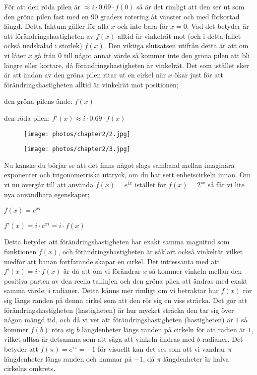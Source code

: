 \documentclass[10pt, a4paper]{amsart}
\begin{document}
För att den röda pilen är $ \approx i \cdot 0.69 \cdot f(0) $ så är det rimligt att den ser ut som den gröna pilen fast med en 90 graders rotering åt vänster och med förkortad längd.
Detta faktum gäller för alla $ x $ och inte bara för $ x = 0 $. Vad det betyder är att förändringshastigheten av $ f(x) $ alltid är vinkelrät mot (och i detta fallet också nedskalad i storlek) $ f(x) $.
Den viktiga slutsatsen utifrån detta är att om vi låter $ x $ gå från $ 0 $ till något annat värde så kommer inte den gröna pilen att bli längre eller kortare, då förändringshastigheten är vinkelrät.
Det som istället sker är att ändan av den gröna pilen ritar ut en cirkel när $ x $ ökar just för att förändringshastigheten alltid är vinkelrät mot positionen;
\bigskip

\bigskip
\hspace{5ex}
den gröna pilens ände: $ f(x) $

\hspace{5ex}
den röda pilen: $ f'(x) \approx i \cdot 0.69 \cdot f(x) $

\begin{figure}[H]
    \texttt{[image: photos/chapter2/2.jpg]}
\end{figure}

\begin{figure}[H]
    \texttt{[image: photos/chapter2/3.jpg]}
\end{figure}

Nu kanske du börjar se att det finns något slags samband mellan imaginära exponenter och trigonometriska uttryck, om du har sett enhetscirkeln innan. Om vi nu övergår till att använda $ f(x) = e^{ix} $ istället för $ f(x) = 2^{ix} $ så får vi lite nya användbara egenskaper;
\bigskip

\bigskip
\hspace{5ex}
$ f(x) = e^{xi} $

\hspace{5ex}
$ f'(x) = i \cdot e^{xi} = i \cdot f(x) $ 
\bigskip
\bigskip

Detta betyder att förändringshastigheten har exakt samma magnitud som funktionen $ f(x) $, 
och förändringshastigheten är såklart också vinkelrät vilket medför att banan fortfarande skapar en cirkel.
Det intressanta med att $ f'(x) = i \cdot f(x) $ är då att om vi förändrar $ x $ så kommer vinkeln mellan den positiva parten av den reella tallinjen och den gröna pilen att ändras med exakt samma värde, i radianer.
Detta känns mer rimligt om vi betraktar hur $ f(x) $ rör sig längs randen på denna cirkel som att den rör sig en viss sträcka. Det gör att förändringshastigheten (hastigheten) är hur mycket sträcka den tar sig över någon mängd tid,
och då vi vet att förändringshastigheten (hastigheten) är $ 1 $ så kommer $ f(b) $ röra sig $ b $ längdenheter längs randen på cirkeln för att radien är $ 1 $, vilket alltså är detsamma som att säga att vinkeln ändras med $ b $ radianer.
Det betyder att $ f(\pi) = e^{i\pi} = -1 $ för visuellt kan det ses som att vi vandrar $ \pi $ längdenheter längs randen och hamnar på $ -1 $, då $ \pi $ längdenheter är halva cirkelns omkrets.
\bigskip
\end{document}
